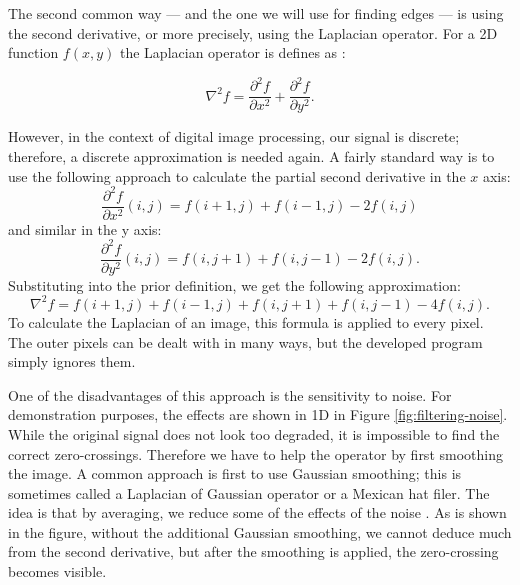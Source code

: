 \documentclass[
  digital,     %
  oneside,     %
  nosansbold,  %
  nocolorbold, %
  lof,         %
  lot,         %
]{fithesis4}
\begin{document}
The second common way --- and the one we will use for finding edges --- is using the second derivative, or more
precisely, using the Laplacian operator. For a 2D function $f(x, y)$ the Laplacian operator is
defines as \cite{gonzalez2002}:

$$\nabla^2 f = \frac{\partial^2 f}{\partial x^2} + \frac{\partial^2 f}{\partial y^2}.$$

However, in the context of digital image processing, our signal is discrete;
therefore, a discrete approximation is needed again. A fairly standard way is to use
the following approach to calculate the partial second derivative in the $x$
axis:
$$\frac{\partial^2 f}{\partial x^2}(i, j) = f(i + 1, j) + f(i - 1, j) - 2f(i, j)$$
and similar in the y axis:
$$\frac{\partial^2 f}{\partial y^2}(i, j) = f(i, j + 1) + f(i, j - 1) - 2f(i, j).$$
Substituting into the prior definition, we get the following approximation:
$$\nabla^2 f = f(i+1, j) + f(i-1, j) + f(i, j+1) + f(i, j-1) - 4f(i,j).$$
To calculate the Laplacian of an image, this formula is applied to every pixel.
The outer pixels can be dealt with in many ways, but the developed program simply
ignores them.


One of the disadvantages of this approach is the sensitivity to noise. For
demonstration purposes, the effects are shown in 1D in Figure
\ref{fig:filtering-noise}. While the original
signal does not look too degraded, it is impossible to find the correct
zero-crossings. Therefore we have to help the operator by first smoothing the
image. A common approach is first to use Gaussian smoothing; this is sometimes
called a Laplacian of Gaussian operator or a Mexican hat filer. The idea is that
by averaging, we reduce some of the effects of the noise
\cite{hipr-mexican-hat}. As is shown in the figure, without the additional Gaussian
smoothing, we cannot deduce much from the second derivative, but after the smoothing
is applied, the zero-crossing becomes visible.
\end{document}
